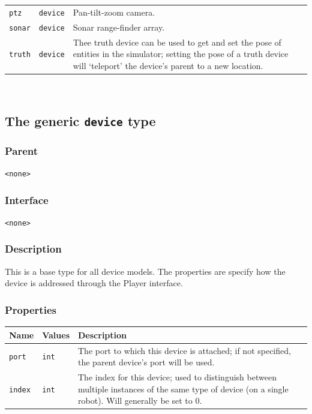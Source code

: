 \documentclass[11pt,twoside]{report}
\begin{document}
\begin{tabularx}{\columnwidth}{llX}
\verb'ptz' & \verb'device' & Pan-tilt-zoom camera. \\

\verb'sonar' & \verb'device' & Sonar range-finder array.\\

\verb'truth' & \verb'device' & Thee truth device can be used to get
and set the pose of entities in the simulator; setting the pose of a
truth device will `teleport' the device's parent to a new location.\\

\hline
\end{tabularx}
\vspace{1em}\\

\newpage
\subsection{The generic {\tt device} type}

\subsubsection*{Parent}
{\tt <none>}

\subsubsection*{Interface}
{\tt <none>}


\subsubsection*{Description}
This is a base type for all device models. The properties are specify
how the device is addressed through the Player interface.

\subsubsection*{Properties}
\begin{tabularx}{\columnwidth}{llX}
\hline
Name & Values & Description \\
\hline

\verb'port' & \verb'int' & The port to which this device is attached;
if not specified, the parent device's port will be used.\\

\verb'index' & \verb'int' & The index for this device; used to
distinguish between multiple instances of the same type of device (on
a single robot).  Will generally be set to 0.\\

\hline
\end{tabularx}
\end{document}

